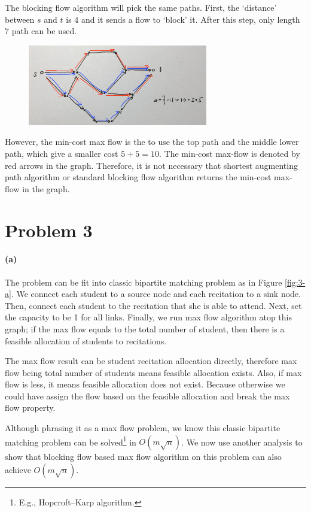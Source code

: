 \documentclass[12pt]{article}
\begin{document}
The blocking flow algorithm will pick the same paths. First, the `distance' between $s$ and $t$ is $4$ and it sends a flow to `block' it. After this step, only length $7$ path can be used. 
\begin{figure}[h!]
	\centering
	\includegraphics[width=0.7\textwidth]{2.jpg}
	\label{fig:2}
\end{figure}

However, the min-cost max flow is the to use the top path and the middle lower path, which give a smaller cost $5 + 5 = 10$. The min-cost max-flow is denoted by red arrows in the graph. Therefore, it is not necessary that shortest augmenting path algorithm or standard blocking flow algorithm returns the min-cost max-flow in the graph.

\pagebreak

\section*{Problem 3}
\paragraph{(a)} The problem can be fit into classic bipartite matching problem as in Figure \ref{fig:3-a}. We connect each student to a source node and each recitation to a sink node. Then, connect each student to the recitation that she is able to attend. Next, set the capacity to be 1 for all links. Finally, we run max flow algorithm atop this graph; if the max flow equals to the total number of student, then there is a feasible allocation of students to recitations. 

The max flow result can be student recitation allocation directly, therefore max flow being total number of students means feasible allocation exists. Also, if max flow is less, it means feasible allocation does not exist. Because otherwise we could have assign the flow based on the feasible allocation and break the max flow property. 

Although phrasing it as a max flow problem, we know this classic bipartite matching problem can be solved\footnote{E.g., Hopcroft–Karp algorithm.} in $O(m\sqrt{n})$. We now use another analysis to show that blocking flow based max flow algorithm on this problem can also achieve $O(m\sqrt{n})$. 
\end{document}
